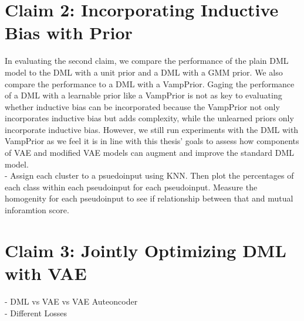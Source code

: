 \documentclass[./dissertation.tex]{subfiles}
\begin{document}
    \section{Claim 2: Incorporating Inductive Bias with Prior}
    In evaluating the second claim, we compare the performance of the plain DML model to the DML with a unit prior and a DML with a GMM prior. We also compare the performance to a DML with a VampPrior. Gaging the performance of a DML with a learnable prior like a VampPrior is not as key to evaluating whether inductive bias can be incorporated because the VampPrior not only incorporates inductive bias but adds complexity, while the unlearned priors only incorporate inductive bias. However, we still run experiments with the DML with VampPrior as we feel it is in line with this thesis' goals to assess how components of VAE and modified VAE models can augment and improve the standard DML model. \\ 
    - Assign each cluster to a psuedoinput using KNN. Then plot the percentages of each class within each pseudoinput for each pseudoinput. Measure the homogenity for each pseudoinput to see if relationship between that and mutual inforamtion score.
    \section{Claim 3: Jointly Optimizing DML with VAE}
    - DML vs VAE vs VAE Auteoncoder \\
    - Different Losses
    
    
\end{document}

